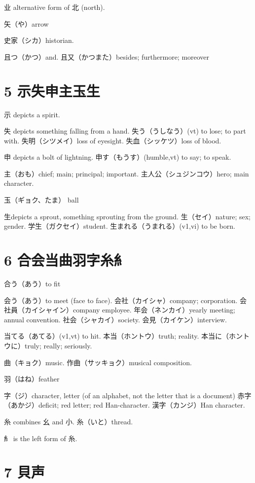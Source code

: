 业 alternative form of 北 (north).

矢（や）arrow

史家（シカ）historian.

且つ（かつ）and.
且又（かつまた）besides; furthermore; moreover

\section{5 ⽰失申主玉生}

⽰ depicts a spirit.

失 depicts something falling from a hand.
失う（うしなう）(vt) to lose; to part with.
失明（シツメイ）loss of eyesight.
失血（シッケツ）loss of blood.

申 depicts a bolt of lightning.
申す（もうす）(humble,vt) to say; to speak.

主（おも）chief; main; principal; important.
主人公（シュジンコウ）hero; main character.

玉（ギョク、たま） ball

生depicts a sprout, something sprouting from the ground.
生（セイ）nature; sex; gender.
学生（ガクセイ）student.
生まれる（うまれる）(v1,vi) to be born.

\section{6 合会当曲羽字糸糹}

合う（あう）to fit

会う（あう）to meet (face to face).
会社（カイシャ）company; corporation.
会社員（カイシャイン）company employee.
年会（ネンカイ）yearly meeting; annual convention.
社会（シャカイ）society.
会見（カイケン）interview.

当てる（あてる）(v1,vt) to hit.
本当（ホントウ）truth; reality.
本当に（ホントウに）truly; really; seriously.

曲（キョク）music.
作曲（サッキョク）musical composition.

羽（はね）feather

字（ジ）character, letter (of an alphabet, not the letter that is a document)
赤字（あかジ）deficit; red letter; red Han-character.
漢字（カンジ）Han character.

糸 combines 幺 and 小.
糸（いと）thread.

糹 is the left form of 糸.

\section{7 貝声}

